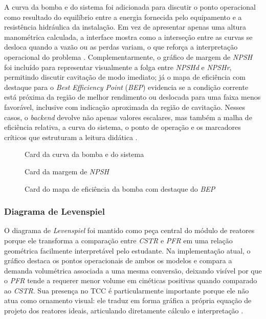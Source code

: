 A curva da bomba e do sistema foi adicionada para discutir o ponto operacional como resultado do equilíbrio entre a energia fornecida pelo equipamento e a resistência hidráulica da instalação. Em vez de apresentar apenas uma altura manométrica calculada, a interface mostra como a interseção entre as curvas se desloca quando a vazão ou as perdas variam, o que reforça a interpretação operacional do problema \cite{fox2011}. Complementarmente, o gráfico de margem de \textit{NPSH} foi incluído para representar visualmente a folga entre \textit{NPSHd} e \textit{NPSHr}, permitindo discutir cavitação de modo imediato; já o mapa de eficiência com destaque para o \textit{Best Efficiency Point} (\textit{BEP}) evidencia se a condição corrente está próxima da região de melhor rendimento ou deslocada para uma faixa menos favorável, inclusive com indicação aproximada da região de cavitação. Nesses casos, o \textit{backend} devolve não apenas valores escalares, mas também a malha de eficiência relativa, a curva do sistema, o ponto de operação e os marcadores críticos que estruturam a leitura didática \cite{karassik2008,fox2011}.

\begin{figure}[H]
    \centering
    \caption{Card da curva da bomba e do sistema}
    \label{fig:viz_curva_bomba_sistema}
\end{figure}

\begin{figure}[H]
    \centering
    \caption{Card da margem de \textit{NPSH}}
    \label{fig:viz_margem_npsh}
\end{figure}

\begin{figure}[H]
    \centering
    \caption{Card do mapa de eficiência da bomba com destaque do \textit{BEP}}
    \label{fig:viz_bep}
\end{figure}

\subsubsection{Diagrama de Levenspiel}

O diagrama de \textit{Levenspiel} foi mantido como peça central do módulo de reatores porque ele transforma a comparação entre \textit{CSTR} e \textit{PFR} em uma relação geométrica facilmente interpretável pelo estudante. Na implementação atual, o gráfico destaca os pontos operacionais de ambos os modelos e compara a demanda volumétrica associada a uma mesma conversão, deixando visível por que o \textit{PFR} tende a requerer menor volume em cinéticas positivas quando comparado ao \textit{CSTR}. Sua presença no TCC é particularmente importante porque ele não atua como ornamento visual: ele traduz em forma gráfica a própria equação de projeto dos reatores ideais, articulando diretamente cálculo e interpretação \cite{levenspiel2000,fogler2009}.

